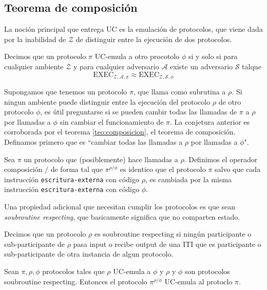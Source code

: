 \subsection{Teorema de composición}

La noción principal que entrega UC es la emulación de protocolos, que viene dada por la inabilidad de
$\mathcal{Z}$ de distinguir entre la ejecución de dos protocolos.

\begin{definicion}
Decimos que un protocolo $\pi$ UC-emula a otro procotolo $\phi$ si y solo si para cualquier ambiente
$\mathcal{Z}$ y para cualquier adversario $\mathcal{A}$ existe un adversario $\mathcal{S}$ talque
$$\mathrm{EXEC}_{\mathcal{Z}, \mathcal{A}, \pi} \approx \mathrm{EXEC}_{\mathcal{Z}, \mathcal{S}, \phi}$$
\end{definicion}

Supongamos que tenemos un protocolo $\pi$, que llama como subrutina a $\rho$. Si ningun ambiente puede
distinguir entre la ejecución del protocolo $\rho$ de otro protocolo $\phi$, es útil preguntarse si se pueden
cambir todas las llamadas de $\pi$ a $\rho$ por llamadas a $\phi$ sin cambiar el funcionamiento de
$\pi$. La conjetura anterior es corroborada por el teorema \ref{teo:composicion}, el teorema de composición.
Definamos primero que es ``cambiar todas las llamadas a $\rho$ por llamadas a $\phi$".

\begin{definicion}
Sea $\pi$ un protocolo que (posiblemente) hace llamadas a $\rho$. Definimos el operador composición $/$ de forma tal
que $\pi^{\rho/\phi}$ es identico que el protocolo $\pi$ salvo que cada instrucción \texttt{escritura-externa}
con código $\rho$, es cambiada por la misma instrucción \texttt{escritura-externa} con código $\phi$.
\end{definicion}

Una propiedad adicional que necesitan cumplir los protocolos es que sean \textit{soubroutine respecting}, que
basicamente significa que no comparten estado.

\begin{definicion}
Decimos que un protocolo $\rho$ es soubroutine respecting si ningún participante o sub-participante de $\rho$
pasa input o recibe output de una ITI que es participante o sub-participante de otra instancia de algun
protocolo.
\end{definicion}

\begin{teorema}[Composición]
Sean $\pi, \rho, \phi$ protocolos tales que $\rho$ UC-emula a $\phi$ y $\rho$ y $\phi$ son protocolos
soubroutine respecting. Entonces el protocolo $\pi^{\rho/\phi}$ UC-emula al protoclo $\pi$.
\label{teo:composicion}
\end{teorema}

